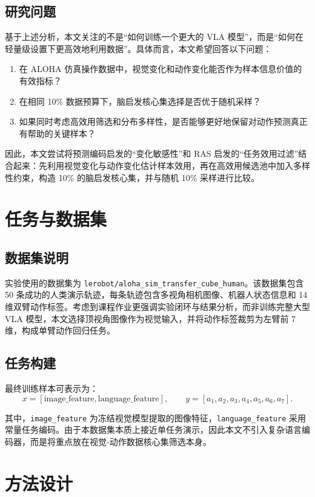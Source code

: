 \documentclass[UTF8,a4paper,12pt]{ctexart}
\begin{document}
\subsection{研究问题}

基于上述分析，本文关注的不是“如何训练一个更大的 VLA 模型”，而是“如何在轻量级设置下更高效地利用数据”。具体而言，本文希望回答以下问题：
\begin{enumerate}
  \item 在 ALOHA 仿真操作数据中，视觉变化和动作变化能否作为样本信息价值的有效指标？
  \item 在相同 10\% 数据预算下，脑启发核心集选择是否优于随机采样？
  \item 如果同时考虑高效用筛选和分布多样性，是否能够更好地保留对动作预测真正有帮助的关键样本？
\end{enumerate}

因此，本文尝试将预测编码启发的“变化敏感性”和 RAS 启发的“任务效用过滤”结合起来：先利用视觉变化与动作变化估计样本效用，再在高效用候选池中加入多样性约束，构造 10\% 的脑启发核心集，并与随机 10\% 采样进行比较。

\section{任务与数据集}

\subsection{数据集说明}

实验使用的数据集为 \texttt{lerobot/aloha\_sim\_transfer\_cube\_human}。该数据集包含 50 条成功的人类演示轨迹，每条轨迹包含多视角相机图像、机器人状态信息和 14 维双臂动作标签。考虑到课程作业更强调实验闭环与结果分析，而非训练完整大型 VLA 模型，本文选择顶视角图像作为视觉输入，并将动作标签裁剪为左臂前 7 维，构成单臂动作回归任务。

\subsection{任务构建}

最终训练样本可表示为：
\[
x = [\text{image\_feature}, \text{language\_feature}], \qquad
y = [a_1, a_2, a_3, a_4, a_5, a_6, a_7].
\]

其中，\texttt{image\_feature} 为冻结视觉模型提取的图像特征，\texttt{language\_feature} 采用常量任务编码。由于本数据集本质上接近单任务演示，因此本文不引入复杂语言编码器，而是将重点放在视觉-动作数据核心集筛选本身。

\section{方法设计}
\end{document}
